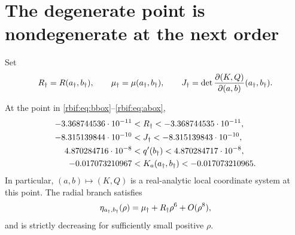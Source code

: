 \section{The degenerate point is nondegenerate at the next order}
\label{rbif:sec:point}
Set
\[
 R_\dagger=R(a_\dagger,b_\dagger),\qquad \mu_\dagger=\mu(a_\dagger,b_\dagger),\qquad
 J_\dagger=\det\frac{\partial(K,Q)}{\partial(a,b)}(a_\dagger,b_\dagger).
\]
\begin{theorem}
\label{rbif:thm:nondeg}
At the point in \eqref{rbif:eq:bbox}--\eqref{rbif:eq:abox},
\begin{align}
 -3.368744536\cdot10^{-11}&<R_\dagger<-3.368744535\cdot10^{-11},
 \label{rbif:eq:Rbox}\\
 -8.315139844\cdot10^{-10}&<J_\dagger<-8.315139843\cdot10^{-10},
 \label{rbif:eq:Jbox}\\
 4.870284716\cdot10^{-8}&<q'(b_\dagger)<4.870284717\cdot10^{-8},
 \label{rbif:eq:qpbox}\\
 -0.017073210967&<K_a(a_\dagger,b_\dagger)<-0.017073210965.
 \label{rbif:eq:Kabox}
\end{align}
In particular, $(a,b)\mapsto(K,Q)$ is a real-analytic local coordinate
system at this point. The radial branch satisfies
\begin{equation}
 \eta_{a_\dagger,b_\dagger}(\rho)=\mu_\dagger+R_\dagger\rho^6+O(\rho^8),
 \label{rbif:eq:degexp}
\end{equation}
and is strictly decreasing for sufficiently small positive $\rho$.
\end{theorem}
